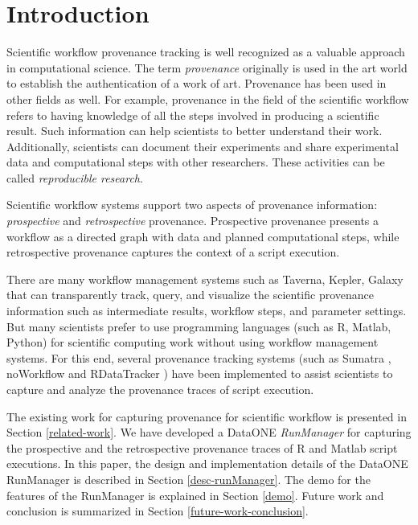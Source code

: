 \documentclass[runningheads,a4paper]{llncs}
\begin{document}
{\section{Introduction}

Scientific workflow provenance tracking is well recognized as a valuable approach in computational science. The term \emph{provenance} originally is used in the art world to establish the authentication of a work of art. Provenance has been used in other fields as well. For example, provenance in the field of the scientific workflow refers to having knowledge of all the steps involved in producing a scientific result.  Such information can help scientists to better understand their work. Additionally, scientists can document their experiments and share experimental data and computational steps with other researchers.  These activities can be called \emph{reproducible research}.

Scientific workflow systems support two aspects of provenance information: \emph{prospective} and \emph{retrospective} provenance. Prospective provenance presents a workflow as a directed graph with data and planned computational steps, while retrospective provenance captures the context of a script execution. 

There are many workflow management systems such as Taverna, Kepler, Galaxy that can transparently track, query, and visualize the scientific provenance information such as intermediate results, workflow steps, and parameter settings.  But many scientists prefer to use programming languages (such as R, Matlab, Python) for scientific computing work without using workflow management systems. For this end, several provenance tracking systems (such as Sumatra \cite{sumatra} \cite{sumatra-impl}, noWorkflow \cite{noworkflow} and RDataTracker \cite{rdatatracker}) have been implemented to assist scientists to capture and analyze the provenance traces of script execution. 

The existing work for capturing provenance for scientific workflow is presented in Section \ref{related-work}. We have developed a DataONE \emph{RunManager} for capturing the prospective and the retrospective provenance traces of R and Matlab script executions. In this paper, the design and implementation details of the DataONE RunManager is described in Section \ref{desc-runManager}. The demo for the features of the RunManager is explained in Section \ref{demo}. Future work and conclusion is summarized in Section \ref{future-work-conclusion}.



}
\end{document}
